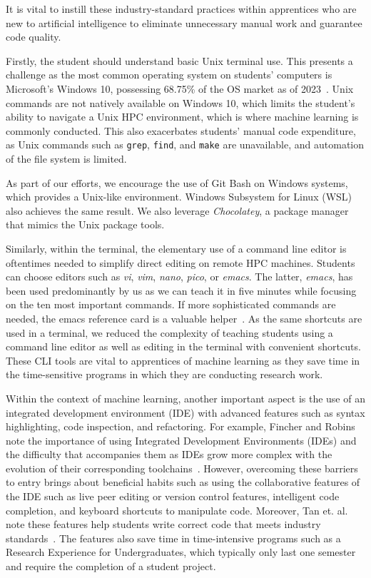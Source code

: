 \documentclass[utf8]{FrontiersinVancouver} %
\begin{document}
It is vital to instill these industry-standard practices within apprentices who are new to artificial intelligence to eliminate unnecessary manual work and guarantee code quality.

Firstly, the student should understand basic Unix terminal use. This presents a challenge as the most common operating system on students' computers is Microsoft's Windows 10, possessing 68.75\% of the OS market as of 2023~\cite{norem}. Unix commands are not natively available on Windows 10, which limits the student's ability to navigate a Unix HPC environment, which is where machine learning is commonly conducted. This also exacerbates students' manual code expenditure, as Unix commands such as \verb|grep|, \verb|find|, and \verb|make| are unavailable, and automation of the file system is limited.

As part of our efforts, we encourage the use of Git Bash on Windows systems, which provides a Unix-like environment. Windows Subsystem for Linux (WSL) also achieves the same result. We also leverage {\em Chocolatey}, a package manager that mimics the Unix package tools.

Similarly, within the terminal, the elementary use of a command line editor is oftentimes needed to simplify direct editing on remote HPC machines. Students can choose editors such as {\em vi}, {\em vim}, {\em nano}, {\em pico}, or {\em emacs}. The latter, {\em emacs}, has been used predominantly by us as we can teach it in five minutes while focusing on the ten most important commands. If more sophisticated commands are needed, the emacs reference card is a valuable helper~\cite{emacs-reference}. As the same shortcuts are used in a terminal, we reduced the complexity of teaching students using a command line editor as well as editing in the terminal with convenient shortcuts. These CLI tools are vital to apprentices of machine learning as they save time in the time-sensitive programs in which they are conducting research work.

Within the context of machine learning, another important aspect is the use of an integrated development environment (IDE) with advanced features such as syntax highlighting, code inspection, and refactoring. For example, Fincher and Robins note the importance of using Integrated Development Environments (IDEs) and the difficulty that accompanies them as IDEs grow more complex with the evolution of their corresponding toolchains~\cite{fincher_robins_2019}. However, overcoming these barriers to entry brings about beneficial habits such as using the collaborative features of the IDE such as live peer editing or version control features, intelligent code completion, and keyboard shortcuts to manipulate code. Moreover, Tan et. al. note these features help students write correct code that meets industry standards~\cite{tan_chen}. The features also save time in time-intensive programs such as a Research Experience for Undergraduates, which typically only last one semester and require the completion of a student project.
\end{document}
